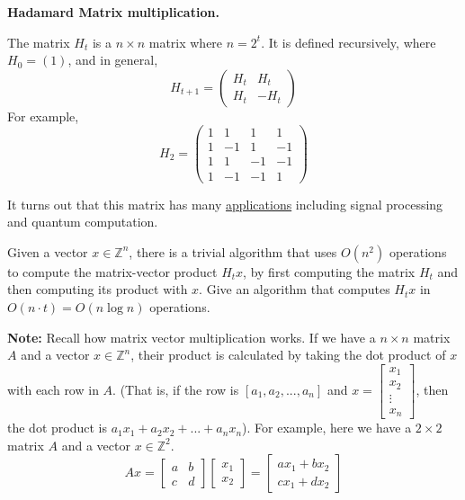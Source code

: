 \documentclass[11pt,addpoints,answers]{exam}
\begin{document}
\begin{questions}
\question[15] \textbf{Hadamard Matrix multiplication.} 


The matrix $H_t$ is a $n\times n$ matrix where $n=2^t$.
It is defined recursively, where $H_0 = (1)$, and in general,
\[
H_{t+1} = \left(
\begin{array}{rr}
H_t  & H_t\\
H_t  & - H_t
\end{array}
\right)
\]
For example,
\[
H_2 = \left(
\begin{array}{rrrr}
1 & 1 & 1 & 1 \\
1 & -1& 1 & -1\\
1 & 1 & -1 & -1\\
1 & -1 & -1 & 1
\end{array}
\right)
\]

It turns out that this matrix has many \href{https://en.wikipedia.org/wiki/Hadamard_matrix#Practical_applications}{applications} including signal processing and quantum computation.

Given a vector $x \in \mathbb{Z}^{n}$, there is a trivial algorithm that uses $O(n^2)$ operations to compute the matrix-vector product $H_t x$, by first computing the matrix $H_t$ and then computing its product with $x$.
Give an algorithm that computes $H_t x$ in $O(n \cdot t)=O(n\log n)$ operations. 


\textbf{Note: } Recall how matrix vector multiplication works. If we have a $n\times n$ matrix $A$ and a vector $x\in \mathbb{Z}^n$, their product is calculated by taking the dot product of $x$ with each row in $A$. (That is, if the row is $[a_1, a_2, ..., a_n]$ and $x = \begin{bmatrix}
       x_1 \\
       x_2 \\
       \vdots \\
       x_n
       \end{bmatrix}$, then the dot product is $a_1x_1 + a_2x_2 + ... + a_nx_n$). For example, here we have a $2\times 2$ matrix $A$ and a vector $x\in \mathbb{Z}^2$.
\begin{equation*}
       A x = 
       \begin{bmatrix}
       a & b \\
       c & d
       \end{bmatrix}
       \begin{bmatrix}
       x_1 \\
       x_2
       \end{bmatrix}
       = 
       \begin{bmatrix}
       ax_1 + bx_2 \\
       cx_1 + dx_2
       \end{bmatrix}
   \end{equation*}


\end{questions}
\end{document}
